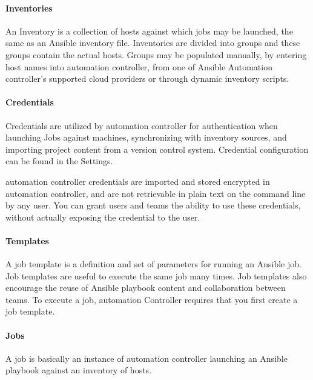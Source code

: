 \hypertarget{inventories}{%
\paragraph{Inventories}\label{inventories}}

An Inventory is a collection of hosts against which jobs may be
launched, the same as an Ansible inventory file. Inventories are divided
into groups and these groups contain the actual hosts. Groups may be
populated manually, by entering host names into automation controller,
from one of Ansible Automation controller's supported cloud providers or
through dynamic inventory scripts.

\hypertarget{credentials}{%
\paragraph{Credentials}\label{credentials}}

Credentials are utilized by automation controller for authentication
when launching Jobs against machines, synchronizing with inventory
sources, and importing project content from a version control system.
Credential configuration can be found in the Settings.

automation controller credentials are imported and stored encrypted in
automation controller, and are not retrievable in plain text on the
command line by any user. You can grant users and teams the ability to
use these credentials, without actually exposing the credential to the
user.

\hypertarget{templates}{%
\paragraph{Templates}\label{templates}}

A job template is a definition and set of parameters for running an
Ansible job. Job templates are useful to execute the same job many
times. Job templates also encourage the reuse of Ansible playbook
content and collaboration between teams. To execute a job, automation
Controller requires that you first create a job template.

\hypertarget{jobs}{%
\paragraph{Jobs}\label{jobs}}

A job is basically an instance of automation controller launching an
Ansible playbook against an inventory of hosts.

